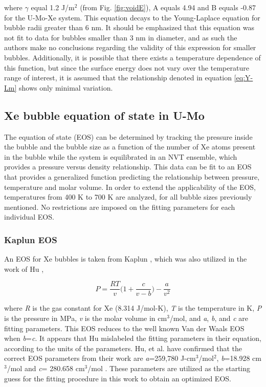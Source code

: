 \documentclass[review]{elsarticle}
\begin{document}
where $\gamma$ equal 1.2 J/m$^2$ (from Fig. \ref{fig:voidE}), A equals 4.94 and B equals -0.87 for the U-Mo-Xe system. This equation decays to the Young-Laplace equation for bubble radii greater than 6 nm. It should be emphasized that this equation was not fit to data for bubbles smaller than 3 nm in diameter, and as such the authors make no conclusions regarding the validity of this expression for smaller bubbles. Additionally, it is possible that there exists a temperature dependence of this function, but since the surface energy does not vary over the temperature range of interest, it is assumed that the relationship denoted in equation \ref{eq:Y-Lm} shows only minimal variation.


\FloatBarrier

\subsection{Xe bubble equation of state in U-Mo}

The equation of state (EOS) can be determined by tracking the pressure inside the bubble and the bubble size as a function of the number of Xe atoms present in the bubble while the system is equilibrated in an NVT ensemble, which provides a pressure versus density relationship. This data can be fit to an EOS that provides a generalized function predicting the relationship between pressure, temperature and molar volume. In order to extend the applicability of the EOS, temperatures from 400 K to 700 K are analyzed, for all bubble sizes previously mentioned. No restrictions are imposed on the fitting parameters for each individual EOS. 

\subsubsection{Kaplun EOS}\label{kapluneos}

An EOS for Xe bubbles is taken from Kaplun \cite{kaplun2003}, which was also utilized in the work of Hu \cite{hu2017}, 

\begin{equation}
\label{eq:EOS}
P=\frac{RT}{v}\bigg( 1+\frac{c}{v-b}\bigg)-\frac{a}{v^2}
\end{equation}

where \textit{R} is the gas constant for Xe (8.314 J/mol-K\cite{kaplun2003}), \textit{T} is the temperature in K, \textit{P} is the pressure in MPa, \textit{v} is the molar volume in cm$^3$/mol, and \textit{a}, \textit{b}, and \textit{c} are fitting parameters. This EOS reduces to the well known Van der Waals EOS when \textit{b}=\textit{c}. It appears that Hu \cite{hu2017} mislabeled the fitting parameters in their equation, according to the units of the parameters. Hu, et al. have confirmed that the correct EOS parameters from their work are \textit{a}=259,780 J-cm$^3$/mol$^2$, \textit{b}=18.928 cm$^3$/mol and \textit{c}= 280.658 cm$^3$/mol \cite{hu2017}. These parameters are utilized as the starting guess for the fitting procedure in this work to obtain an optimized EOS. 
\end{document}
